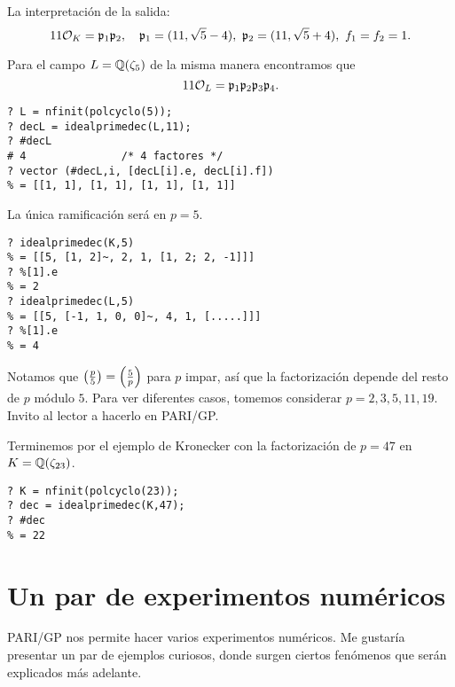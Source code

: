 La interpretación de la salida:
\[ 11\mathcal{O}_K = \mathfrak{p}_1 \mathfrak{p}_2, \quad
   \mathfrak{p}_1 = (11, \sqrt{5}-4), ~
   \mathfrak{p}_2 = (11, \sqrt{5}+4), ~
   f_1 = f_2 = 1. \]

Para el campo $L = \mathbb{Q} (\zeta_5)$ de la misma manera encontramos que
$$11\mathcal{O}_L = \mathfrak{p}_1 \mathfrak{p}_2 \mathfrak{p}_3 \mathfrak{p}_4.$$

\begin{shaded}
\begin{verbatim}
? L = nfinit(polcyclo(5));
? decL = idealprimedec(L,11);
? #decL
# 4               /* 4 factores */
? vector (#decL,i, [decL[i].e, decL[i].f])
% = [[1, 1], [1, 1], [1, 1], [1, 1]]
\end{verbatim}
\end{shaded}

La única ramificación será en $p = 5$.

\begin{shaded}
\begin{verbatim}
? idealprimedec(K,5)
% = [[5, [1, 2]~, 2, 1, [1, 2; 2, -1]]]
? %[1].e
% = 2
? idealprimedec(L,5)
% = [[5, [-1, 1, 0, 0]~, 4, 1, [.....]]]
? %[1].e
% = 4
\end{verbatim}
\end{shaded}

Notamos que $\left(\frac{p}{5}\right) = \left(\frac{5}{p}\right)$ para $p$ impar, así que
la factorización depende del resto de $p$ módulo $5$.  Para ver diferentes
casos, tomemos considerar $p = 2, 3, 5, 11, 19$. Invito al lector a hacerlo
en PARI/GP.

Terminemos por el ejemplo de Kronecker con la factorización de $p = 47$
en $K = \mathbb{Q} (\zeta_{23})$.

\begin{shaded}
\begin{verbatim}
? K = nfinit(polcyclo(23));
? dec = idealprimedec(K,47);
? #dec
% = 22
\end{verbatim}
\end{shaded}


\section{Un par de experimentos numéricos}

PARI/GP nos permite hacer varios experimentos numéricos. Me gustaría presentar
un par de ejemplos curiosos, donde surgen ciertos fenómenos que serán explicados
más adelante.


